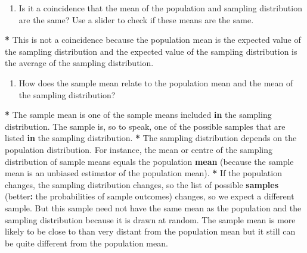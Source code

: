 \documentclass[a4paper]{book}
\newenvironment{Shaded}{\begin{snugshade}}{\end{snugshade}}
\newcommand{\KeywordTok}[1]{\textcolor[rgb]{0,0,0}{\textbf{#1}}}
\newcommand{\StringTok}[1]{\textcolor[rgb]{0.00,0.00,0.00}{#1}}
\newcommand{\ControlFlowTok}[1]{\textcolor[rgb]{0.00,0.00,0.00}{\textbf{#1}}}
\newcommand{\OperatorTok}[1]{\textcolor[rgb]{0.00,0.00,0.00}{\textbf{#1}}}
\newcommand{\NormalTok}[1]{#1}
\providecommand{\tightlist}{%
  \setlength{\itemsep}{0pt}\setlength{\parskip}{0pt}}
\theoremstyle{definition}
\theoremstyle{definition}
\theoremstyle{definition}
\theoremstyle{remark}
\begin{document}
\begin{enumerate}
\def\labelenumi{\arabic{enumi}.}
\setcounter{enumi}{1}
\tightlist
\item
  Is it a coincidence that the mean of the population and sampling
  distribution are the same? Use a slider to check if these means are
  the same.
\end{enumerate}

\begin{Shaded}
\begin{Highlighting}[]
\OperatorTok{*}\StringTok{ }\NormalTok{This is not a coincidence because the population mean is the expected value}
\NormalTok{of the sampling distribution and the expected value of the sampling}
\NormalTok{distribution is the average of the sampling distribution.}
\end{Highlighting}
\end{Shaded}

\begin{enumerate}
\def\labelenumi{\arabic{enumi}.}
\setcounter{enumi}{2}
\tightlist
\item
  How does the sample mean relate to the population mean and the mean of
  the sampling distribution?
\end{enumerate}

\begin{Shaded}
\begin{Highlighting}[]
\OperatorTok{*}\StringTok{ }\NormalTok{The sample mean is one of the sample means included }\ControlFlowTok{in}\NormalTok{ the sampling}
\NormalTok{distribution. The sample is, so to speak, one of the possible samples that are}
\NormalTok{listed }\ControlFlowTok{in}\NormalTok{ the sampling distribution.}
\OperatorTok{*}\StringTok{ }\NormalTok{The sampling distribution depends on the population distribution. For}
\NormalTok{instance, the mean or centre of the sampling distribution of sample means}
\NormalTok{equals the population }\KeywordTok{mean}\NormalTok{ (because the sample mean is an unbiased estimator}
\NormalTok{of the population mean).}
\OperatorTok{*}\StringTok{ }\NormalTok{If the population changes, the sampling distribution changes, so the list of}
\NormalTok{possible }\KeywordTok{samples}\NormalTok{ (better}\OperatorTok{:}\StringTok{ }\NormalTok{the probabilities of sample outcomes) changes, so we}
\NormalTok{expect a different sample. But this sample need not have the same mean as the}
\NormalTok{population and the sampling distribution because it is drawn at random. The}
\NormalTok{sample mean is more likely to be close to than very distant from the}
\NormalTok{population mean but it still can be quite different from the population mean.}
\end{Highlighting}
\end{Shaded}
\end{document}

